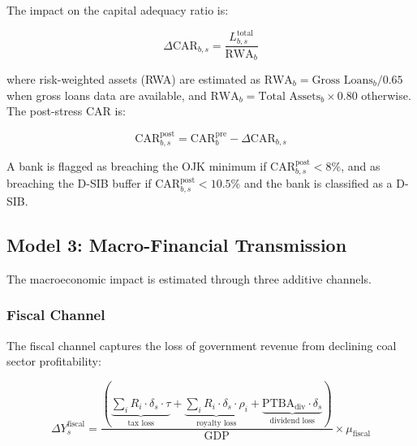 The impact on the capital adequacy ratio is:

\begin{equation}
\label{eq:app_car_impact}
\Delta\text{CAR}_{b,s} = \frac{L_{b,s}^{\text{total}}}{\text{RWA}_b}
\end{equation}

\noindent where risk-weighted assets (RWA) are estimated as $\text{RWA}_b = \text{Gross Loans}_b / 0.65$ when gross loans data are available, and $\text{RWA}_b = \text{Total Assets}_b \times 0.80$ otherwise. The post-stress CAR is:

\begin{equation}
\label{eq:app_car_after}
\text{CAR}_{b,s}^{\text{post}} = \text{CAR}_{b}^{\text{pre}} - \Delta\text{CAR}_{b,s}
\end{equation}

A bank is flagged as breaching the OJK minimum if $\text{CAR}_{b,s}^{\text{post}} < 8\%$, and as breaching the D-SIB buffer if $\text{CAR}_{b,s}^{\text{post}} < 10.5\%$ and the bank is classified as a D-SIB.


\subsection{Model 3: Macro-Financial Transmission}
\label{subsec:app_model3}

The macroeconomic impact is estimated through three additive channels.


\subsubsection{Fiscal Channel}

The fiscal channel captures the loss of government revenue from declining coal sector profitability:

\begin{equation}
\label{eq:app_fiscal}
\Delta Y^{\text{fiscal}}_s = \frac{\left(\underbrace{\sum_i R_i \cdot \delta_s \cdot \tau}_{\text{tax loss}} + \underbrace{\sum_i R_i \cdot \delta_s \cdot \rho_i}_{\text{royalty loss}} + \underbrace{\text{PTBA}_{\text{div}} \cdot \delta_s}_{\text{dividend loss}}\right)}{\text{GDP}} \times \mu_{\text{fiscal}}
\end{equation}

